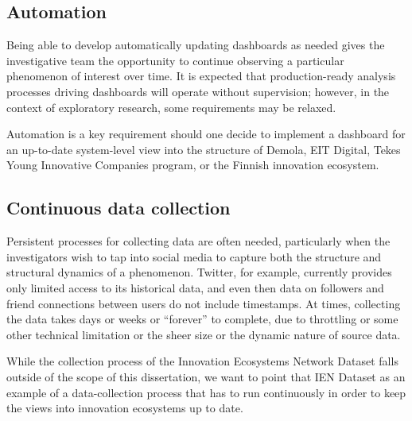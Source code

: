 \subsection{Automation}

Being able to develop automatically updating dashboards as needed gives the investigative team the opportunity to continue observing a particular phenomenon of interest over time. It is expected that production-ready analysis processes driving dashboards will operate without supervision; however, in the context of exploratory research, some requirements may be relaxed.

Automation is a key requirement should one decide to implement a dashboard for an up-to-date system-level view into the structure of Demola, EIT Digital, Tekes Young Innovative Companies program, or the Finnish innovation ecosystem.

\subsection{Continuous data collection}

Persistent processes for collecting data are often needed, particularly when the investigators wish to tap into social media to capture both the structure and structural dynamics of a phenomenon. Twitter, for example, currently provides only limited access to its historical data, and even then data on followers and friend connections between users do not include timestamps. At times, collecting the data takes days or weeks or ``forever'' to complete, due to throttling or some other technical limitation \citep[cf.][]{Salonen2013ChallengesMedia} or the sheer size or the dynamic nature of source data.

While the collection process of the Innovation Ecosystems Network Dataset \citep{Rubens2010LeveragingMoves} falls outside of the scope of this dissertation, we want to point that IEN Dataset as an example of a data-collection process that has to run continuously in order to keep the views into innovation ecosystems up to date.
